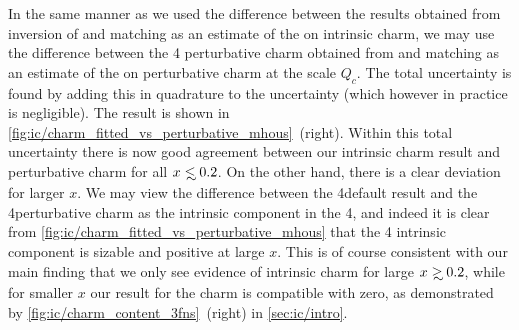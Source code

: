 In the same manner as we used the difference between the results obtained from
inversion of \nnlo and \nnnlo  matching as an estimate of the \mhou on
intrinsic charm, we may use the difference between the 4\fns
 perturbative charm obtained from \nnlo and \nnnlo matching as an
 estimate of the \mhou on perturbative charm at the scale $Q_c$.
 The total uncertainty is found by adding
 this in quadrature to the \pdf uncertainty (which however in practice
 is negligible).
%
The result is shown in 
\cref{fig:ic/charm_fitted_vs_perturbative_mhous}~(right).
Within this total uncertainty there is now good agreement between our
intrinsic charm result and perturbative charm for all
$x\lsim 0.2$. On the other hand, there is a clear deviation for larger
$x$. We may view the difference between the 4\fns default result
and the 4\fns perturbative  charm as the intrinsic component in the
4\fns, and indeed it is clear from
\cref{fig:ic/charm_fitted_vs_perturbative_mhous} that the 4\fns
intrinsic component is sizable and positive at large $x$.
%
This is of course consistent with our main finding that we
only see evidence of intrinsic charm for large $x\gsim 0.2$, while for
smaller $x$ our result for the charm \pdf is compatible with zero, as demonstrated by
\cref{fig:ic/charm_content_3fns}~(right) in \cref{sec:ic/intro}.

